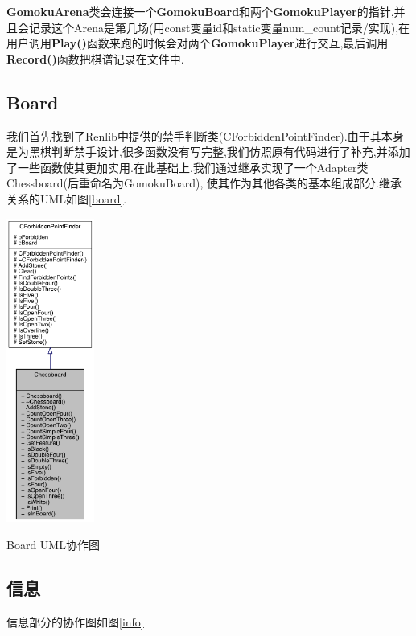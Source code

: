 \documentclass[twocolumn]{article}
\begin{document}
\textbf{GomokuArena}类会连接一个\textbf{GomokuBoard}和两个\textbf{GomokuPlayer}的指针,并且会记录这个Arena是第几场(用const变量id和static变量num\_count记录/实现),在用户调用\textbf{Play()}函数来跑的时候会对两个\textbf{GomokuPlayer}进行交互,最后调用\textbf{Record()}函数把棋谱记录在文件中.

\subsection{Board}

我们首先找到了Renlib\cite{renlib}中提供的禁手判断类(CForbiddenPointFinder).由于其本身是为黑棋判断禁手设计,很多函数没有写完整,我们仿照原有代码进行了补充,并添加了一些函数使其更加实用.在此基础上,我们通过继承实现了一个Adapter类Chessboard(后重命名为GomokuBoard), 使其作为其他各类的基本组成部分.继承关系的UML如图\ref{board}.

\begin{center}
\makeatletter
\def\@captype{figure}
\makeatother
\includegraphics [height=10cm]{board.png}
\caption{Board UML协作图}
\label{board}
\end{center}

\subsection{信息}

信息部分的协作图如图\ref{info}
\end{document}
